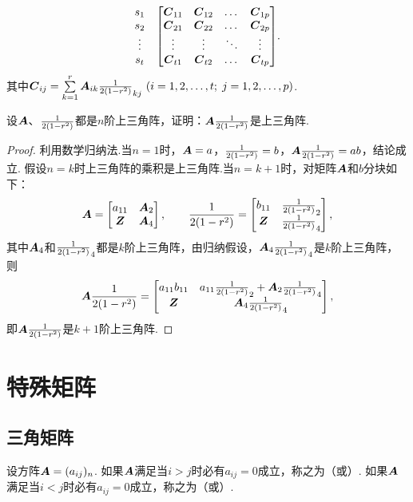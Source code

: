\begin{theorem}
\begin{enumerate}
\begin{align*}
\begin{matrix}
        \begin{matrix} s_1 \\ s_2 \\ \vdots \\ s_t \end{matrix} & \begin{bmatrix}
        \boldsymbol{C}_{11} & \boldsymbol{C}_{12} & \dots & \boldsymbol{C}_{1p} \\
        \boldsymbol{C}_{21} & \boldsymbol{C}_{22} & \dots & \boldsymbol{C}_{2p} \\
        \vdots & \vdots & \ddots & \vdots \\
        \boldsymbol{C}_{t1} & \boldsymbol{C}_{t2} & \dots & \boldsymbol{C}_{tp}
        \end{bmatrix}
    \end{matrix}.
\end{align*}
其中\(\C_{ij}=\sum\limits_{k=1}^r \A_{ik} \B_{kj}\ (i=1,2,\dotsc,t;\;j=1,2,\dotsc,p)\).
\end{enumerate}
\end{theorem}

\begin{example}
设\(\boldsymbol{A}\)、\(\frac{1}{2(1-r^2)}\)都是\(n\)阶上三角阵，证明：\(\boldsymbol{A}\frac{1}{2(1-r^2)}\)是上三角阵.
\begin{proof}
利用数学归纳法.当\(n=1\)时，\(\boldsymbol{A}=a\)，\(\frac{1}{2(1-r^2)}=b\)，\(\boldsymbol{A}\frac{1}{2(1-r^2)} = ab\)，结论成立.
假设\(n=k\)时上三角阵的乘积是上三角阵.当\(n=k+1\)时，对矩阵\(\boldsymbol{A}\)和\(b\)分块如下：\[
\boldsymbol{A} = \begin{bmatrix}
a_{11} & \boldsymbol{A}_2 \\
\boldsymbol{Z} & \boldsymbol{A}_4
\end{bmatrix},
\qquad
\frac{1}{2(1-r^2)} = \begin{bmatrix}
b_{11} & \frac{1}{2(1-r^2)}_2 \\
\boldsymbol{Z} & \frac{1}{2(1-r^2)}_4
\end{bmatrix},
\]其中\(\boldsymbol{A}_4\)和\(\frac{1}{2(1-r^2)}_4\)都是\(k\)阶上三角阵，由归纳假设，\(\boldsymbol{A}_4 \frac{1}{2(1-r^2)}_4\)是\(k\)阶上三角阵，则\[
\boldsymbol{A}\frac{1}{2(1-r^2)} = \begin{bmatrix}
a_{11} b_{11} & a_{11} \frac{1}{2(1-r^2)}_2 + \boldsymbol{A}_2 \frac{1}{2(1-r^2)}_4 \\
\boldsymbol{Z} & \boldsymbol{A}_4 \frac{1}{2(1-r^2)}_4
\end{bmatrix},
\]即\(\boldsymbol{A}\frac{1}{2(1-r^2)}\)是\(k+1\)阶上三角阵.
\end{proof}
\end{example}

\section{特殊矩阵}
\subsection{三角矩阵}
\begin{definition}
设方阵\(\boldsymbol{A}=(a_{ij})_n\).
如果\(\boldsymbol{A}\)满足当\(i>j\)时必有\(a_{ij} = 0\)成立，称之为（或）.
如果\(\boldsymbol{A}\)满足当\(i<j\)时必有\(a_{ij} = 0\)成立，称之为（或）.
\end{definition}

